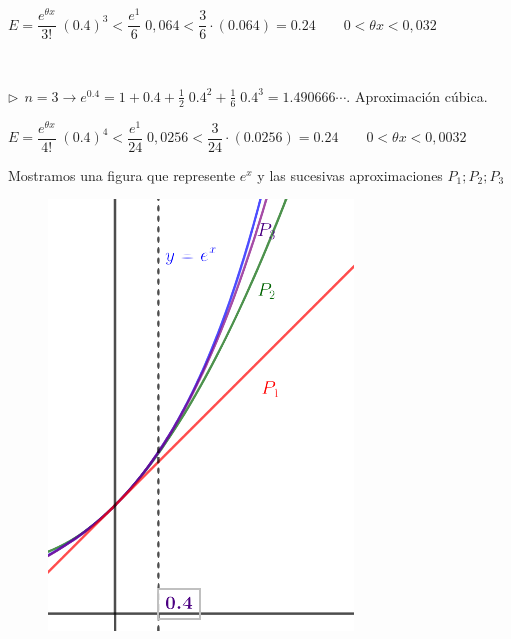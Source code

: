 \begin{miejercicio}
\begin{multicols}{2}
	$E=\dfrac {e^{\theta x}}{3!}\; (0.4)^3 < \dfrac {e^1}{6}\; 0,064 < \dfrac {3}{6} \cdot (0.064)=0.24 \qquad 0<\theta x< 0,032$
	


	$\quad$
	
	$\triangleright \ \ n=3 \to e^{0.4}=1+0.4+\frac 1 2 \; 0.4^2+ \frac 1 {6}\; 0.4^3 =1.490666\cdots $. Aproximación cúbica.
	
	$E=\dfrac {e^{\theta x}}{4!}\; (0.4)^4 < \dfrac {e^1}{24}\; 0,0256 < \dfrac {3}{24} \cdot (0.0256)=0.24 \qquad 0<\theta x< 0,0032$
	
	
	
	Mostramos una figura que represente $e^x$ y las sucesivas aproximaciones $ P_1; P_2; P_3$
	
	\begin{figure}[H]
	\centering
		\includegraphics[width=.25\textwidth]{imagenes/Taylor/T06IM04.png}
		\end{figure}
	
	\end{multicols}
	
	\end{miejercicio}
	 	 
